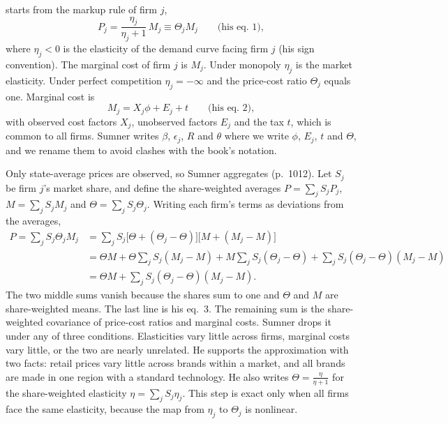 \citet[p.~1011]{Sumner1981} starts from the markup rule of firm $j$,
\begin{equation}\label{eq:C-sumner1}
P_j = \frac{\eta_j}{\eta_j + 1}\,M_j \equiv \Theta_jM_j \qquad \text{(his eq.~1)},
\end{equation}
where $\eta_j < 0$ is the elasticity of the demand curve facing firm $j$ (his sign convention). The marginal cost of
firm $j$ is $M_j$. Under monopoly $\eta_j$ is the market elasticity. Under perfect competition $\eta_j = -\infty$ and
the price-cost ratio $\Theta_j$ equals one. Marginal cost is
\begin{equation}\label{eq:C-sumner2}
M_j = X_j\phi + E_j + t \qquad \text{(his eq.~2)},
\end{equation}
with observed cost factors $X_j$, unobserved factors $E_j$ and the tax $t$, which is common to all firms. Sumner
writes $\beta$, $\epsilon_j$, $R$ and $\theta$ where we write $\phi$, $E_j$, $t$ and $\Theta$, and we rename them to
avoid clashes with the book's notation.

Only state-average prices are observed, so Sumner aggregates (p.~1012). Let $S_j$ be firm $j$'s market share, and
define the share-weighted averages $P = \sum_j S_jP_j$, $M = \sum_j S_jM_j$ and $\Theta = \sum_j S_j\Theta_j$. Writing
each firm's terms as deviations from the averages,
\begin{align*}
P = \sum_j S_j\Theta_jM_j
&= \sum_j S_j\big[\Theta + (\Theta_j - \Theta)\big]\big[M + (M_j - M)\big] \\
&= \Theta M + \Theta\sum_j S_j(M_j - M) + M\sum_j S_j(\Theta_j - \Theta) + \sum_j S_j(\Theta_j - \Theta)(M_j - M) \\
&= \Theta M + \sum_j S_j(\Theta_j - \Theta)(M_j - M) .
\end{align*}
The two middle sums vanish because the shares sum to one and $\Theta$ and $M$ are share-weighted means. The last line
is his eq.~3. The remaining sum is the share-weighted covariance of price-cost ratios and marginal costs. Sumner drops
it under any of three conditions. Elasticities vary little across firms, marginal costs vary little, or the two are
nearly unrelated. He supports the approximation with two facts: retail prices vary little across brands within a
market, and all brands are made in one region with a standard technology. He also writes $\Theta = \frac{\eta}{\eta + 1}$
for the share-weighted elasticity $\eta = \sum_j S_j\eta_j$. This step is exact only when all firms face the same
elasticity, because the map from $\eta_j$ to $\Theta_j$ is nonlinear.

